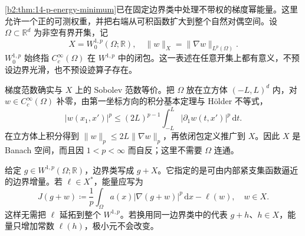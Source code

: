 \cref{b2:thm:14-p-energy-minimum}已在固定边界类中处理不带权的梯度幂能量。这里允许一个正的可测权重，并把右端从可积函数扩大到整个自然对偶空间。设 \(\Omega\subset\mathbb R^d\) 为非空有界开集，记
\[
 X=W_0^{1,p}(\Omega;\mathbb R),
 \quad\|w\|_X=\|\nabla w\|_{L^p(\Omega)}.
\]
\(W_0^{1,p}\) 始终指 \(C_c^\infty(\Omega)\) 在 \(W^{1,p}\) 中的闭包。这一表述在任意开集上都有意义，不预设边界光滑，也不预设迹算子存在。

\ProseParagraphBreak

梯度范数确实与 \(X\) 上的 Sobolev 范数等价。把 \(\Omega\) 放在立方体 \((-L,L)^d\) 内，对 \(w\in C_c^\infty(\Omega)\) 补零，由第一坐标方向的积分基本定理与 Hölder 不等式，
\[
 |w(x_1,x')|^p
 \le(2L)^{p-1}\int_{-L}^{L}|\partial_1w(t,x')|^p\,\mathrm dt.
\]
在立方体上积分得到 \(\|w\|_p\le2L\|\nabla w\|_p\)，再依闭包定义推广到 \(X\)。因此 \(X\) 是 Banach 空间，而且因 \(1<p<\infty\) 而自反；这里不需要 \(\Omega\) 连通。

\ProseParagraphBreak

给定 \(g\in W^{1,p}(\Omega;\mathbb R)\)，边界类写成 \(g+X\)。它指定的是可由内部紧支集函数逼近的边界增量。若 \(\ell\in X^*\)，能量应写为
\[
 J(g+w)\coloneqq\frac1p\int_\Omega a(x)|\nabla(g+w)|^p\,\mathrm dx-\ell(w),
 \quad w\in X.
\]
这样无需把 \(\ell\) 延拓到整个 \(W^{1,p}\)。若换用同一边界类中的代表 \(g+h\)、\(h\in X\)，能量只增加常数 \(\ell(h)\)，极小元不会改变。

